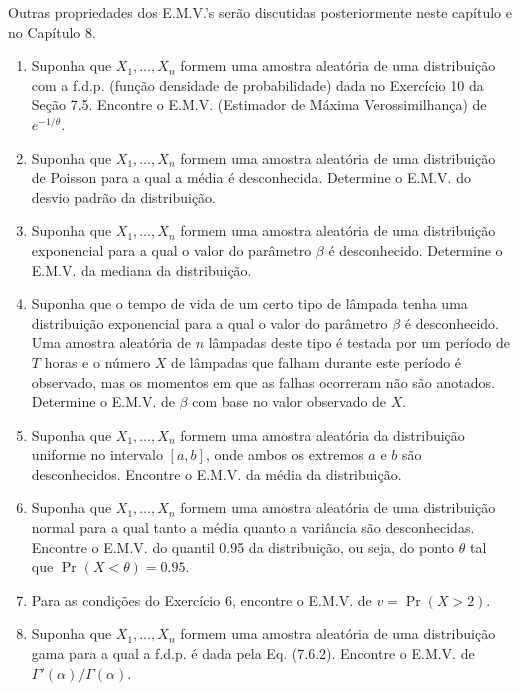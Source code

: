Outras propriedades dos E.M.V.'s serão discutidas posteriormente neste capítulo e no Capítulo 8.

\begin{enumerate}
    \item Suponha que $X_1, \dots, X_n$ formem uma amostra aleatória de uma distribuição com a f.d.p. (função densidade de probabilidade) dada no Exercício 10 da Seção 7.5. Encontre o E.M.V. (Estimador de Máxima Verossimilhança) de $e^{-1/\theta}$.
    
    \item Suponha que $X_1, \dots, X_n$ formem uma amostra aleatória de uma distribuição de Poisson para a qual a média é desconhecida. Determine o E.M.V. do desvio padrão da distribuição.
    
    \item Suponha que $X_1, \dots, X_n$ formem uma amostra aleatória de uma distribuição exponencial para a qual o valor do parâmetro $\beta$ é desconhecido. Determine o E.M.V. da mediana da distribuição.
    
    \item Suponha que o tempo de vida de um certo tipo de lâmpada tenha uma distribuição exponencial para a qual o valor do parâmetro $\beta$ é desconhecido. Uma amostra aleatória de $n$ lâmpadas deste tipo é testada por um período de $T$ horas e o número $X$ de lâmpadas que falham durante este período é observado, mas os momentos em que as falhas ocorreram não são anotados. Determine o E.M.V. de $\beta$ com base no valor observado de $X$.
    
    \item Suponha que $X_1, \dots, X_n$ formem uma amostra aleatória da distribuição uniforme no intervalo $[a, b]$, onde ambos os extremos $a$ e $b$ são desconhecidos. Encontre o E.M.V. da média da distribuição.
    
    \item Suponha que $X_1, \dots, X_n$ formem uma amostra aleatória de uma distribuição normal para a qual tanto a média quanto a variância são desconhecidas. Encontre o E.M.V. do quantil 0.95 da distribuição, ou seja, do ponto $\theta$ tal que $\Pr(X < \theta) = 0.95$.
    
    \item Para as condições do Exercício 6, encontre o E.M.V. de $v = \Pr(X > 2)$.
    
    \item Suponha que $X_1, \dots, X_n$ formem uma amostra aleatória de uma distribuição gama para a qual a f.d.p. é dada pela Eq. (7.6.2). Encontre o E.M.V. de $\Gamma'(\alpha)/\Gamma(\alpha)$.
    

\end{enumerate}
